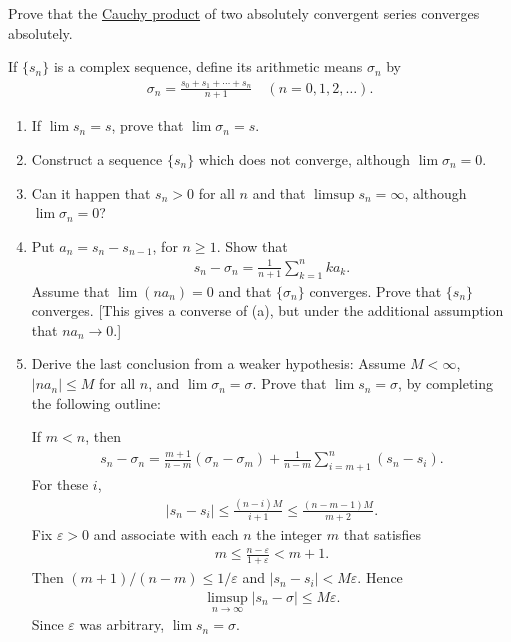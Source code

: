   \begin{exercise}[Rudin 3.13]
    Prove that the \hyperref[def:cauchy-product]{Cauchy product} of two absolutely convergent series converges absolutely.
  \end{exercise}
  \begin{solution}
    
  \end{solution}

  \begin{exercise}[Rudin 3.14]
    If $\{s_n\}$ is a complex sequence, define its arithmetic means $\sigma_n$ by
    \begin{align*}
      \sigma_n = \frac{s_0 + s_1 + \cdots + s_n}{n+1} \quad (n = 0, 1, 2, \ldots).
    \end{align*}
    \begin{enumerate} 
      \item[(a)] If $\lim s_n = s$, prove that $\lim \sigma_n = s$.
      \item[(b)] Construct a sequence $\{s_n\}$ which does not converge, although $\lim \sigma_n = 0$.
      \item[(c)] Can it happen that $s_n > 0$ for all $n$ and that $\limsup s_n = \infty$, although $\lim \sigma_n = 0$?
      \item[(d)] Put $a_n = s_n - s_{n-1}$, for $n \geq 1$. Show that
      \begin{align*}
        s_n - \sigma_n = \frac{1}{n+1} \sum_{k=1}^{n} ka_k.
      \end{align*}
      Assume that $\lim (na_n) = 0$ and that $\{\sigma_n\}$ converges. Prove that $\{s_n\}$ converges. [This gives a converse of (a), but under the additional assumption that $na_n \to 0$.]
      \item[(e)] Derive the last conclusion from a weaker hypothesis: Assume $M < \infty$, $|na_n| \leq M$ for all $n$, and $\lim \sigma_n = \sigma$. Prove that $\lim s_n = \sigma$, by completing the following outline:
      
      If $m < n$, then
      \begin{align*}
        s_n - \sigma_n = \frac{m+1}{n-m}(\sigma_n - \sigma_m) + \frac{1}{n-m} \sum_{i=m+1}^{n} (s_n - s_i).
      \end{align*}
      For these $i$,
      \begin{align*}
        |s_n - s_i| \leq \frac{(n-i)M}{i+1} \leq \frac{(n-m-1)M}{m+2}.
      \end{align*}
      Fix $\varepsilon > 0$ and associate with each $n$ the integer $m$ that satisfies
      \begin{align*}
        m \leq \frac{n-\varepsilon}{1+\varepsilon} < m+1.
      \end{align*}
      Then $(m+1)/(n-m) \leq 1/\varepsilon$ and $|s_n - s_i| < M\varepsilon$. Hence
      \begin{align*}
        \limsup_{n \to \infty} |s_n - \sigma| \leq M\varepsilon.
      \end{align*}
      Since $\varepsilon$ was arbitrary, $\lim s_n = \sigma$.
    \end{enumerate}
  \end{exercise}
